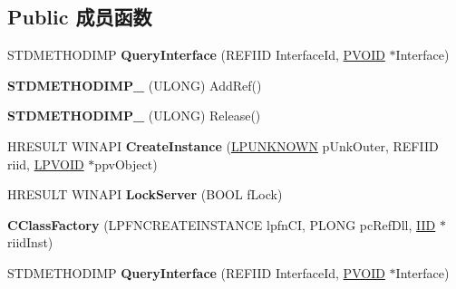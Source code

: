 \subsection*{Public 成员函数}
\begin{DoxyCompactItemize}
\item 
\mbox{\label{class_c_class_factory_a9912a89da64c30a4f804ffd42dd1f9da}} 
S\+T\+D\+M\+E\+T\+H\+O\+D\+I\+MP {\bfseries Query\+Interface} (R\+E\+F\+I\+ID Interface\+Id, \hyperlink{interfacevoid}{P\+V\+O\+ID} $\ast$Interface)
\item 
\mbox{\label{class_c_class_factory_a769e4e226363663e0854552a3bda45cc}} 
{\bfseries S\+T\+D\+M\+E\+T\+H\+O\+D\+I\+M\+P\+\_\+} (U\+L\+O\+NG) Add\+Ref()
\item 
\mbox{\label{class_c_class_factory_ace20a6d5768cbf817b952ff32d0ec9e5}} 
{\bfseries S\+T\+D\+M\+E\+T\+H\+O\+D\+I\+M\+P\+\_\+} (U\+L\+O\+NG) Release()
\item 
\mbox{\label{class_c_class_factory_a3c4ccb9f496a79b2fd37418c928ada06}} 
H\+R\+E\+S\+U\+LT W\+I\+N\+A\+PI {\bfseries Create\+Instance} (\hyperlink{interface_i_unknown}{L\+P\+U\+N\+K\+N\+O\+WN} p\+Unk\+Outer, R\+E\+F\+I\+ID riid, \hyperlink{interfacevoid}{L\+P\+V\+O\+ID} $\ast$ppv\+Object)
\item 
\mbox{\label{class_c_class_factory_ab456aeb3f6ba2d246532a370b69ee471}} 
H\+R\+E\+S\+U\+LT W\+I\+N\+A\+PI {\bfseries Lock\+Server} (B\+O\+OL f\+Lock)
\item 
\mbox{\label{class_c_class_factory_ab0b65f2f3ae9421cc7a8d67962920bc5}} 
{\bfseries C\+Class\+Factory} (L\+P\+F\+N\+C\+R\+E\+A\+T\+E\+I\+N\+S\+T\+A\+N\+CE lpfn\+CI, P\+L\+O\+NG pc\+Ref\+Dll, \hyperlink{struct___i_i_d}{I\+ID} $\ast$riid\+Inst)
\item 
\mbox{\label{class_c_class_factory_a3521365dd055a10b8ff989c16a42bd8f}} 
S\+T\+D\+M\+E\+T\+H\+O\+D\+I\+MP {\bfseries Query\+Interface} (R\+E\+F\+I\+ID Interface\+Id, \hyperlink{interfacevoid}{P\+V\+O\+ID} $\ast$Interface)
\item 
\mbox{\label{class_c_class_factory_a769e4e226363663e0854552a3bda45cc}} 

\end{DoxyCompactItemize}

